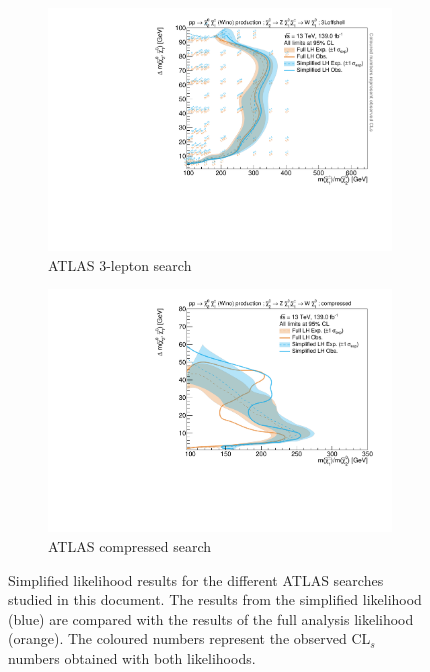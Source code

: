 \begin{figure}
\begin{subfigure}[b]{0.5\textwidth}
		\centering\includegraphics[width=\textwidth]{exclusion_3Loffshell_CLs_noLabel}
		\caption{ATLAS 3-lepton search\label{fig:results_3Loffshell}}
	\end{subfigure}\hfill
	\begin{subfigure}[b]{0.5\textwidth}
		\centering\includegraphics[width=\textwidth]{exclusion_compressed_noLabel}
		\caption{ATLAS compressed search~\cite{SUSY-2018-16}\label{fig:results_compressed}}
	\end{subfigure}\hfill
	\caption{Simplified likelihood results for the different ATLAS searches studied in this document. The results from the simplified likelihood (blue) are compared with the results of the full analysis likelihood (orange). The coloured numbers represent the observed CL$_s$ numbers obtained with both likelihoods.}\label{fig:results_analyses}
\end{figure}



